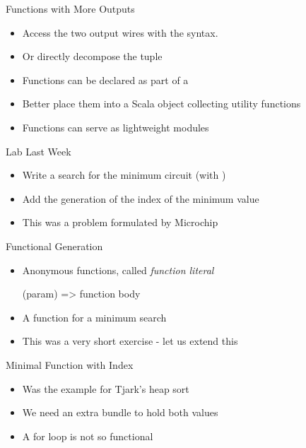 \begin{frame}[fragile]{Functions with More Outputs}
\begin{itemize}
\item Access the two output wires with the  syntax.
\item Or directly decompose the tuple
\item Functions can be declared as part of a 
\item Better place them into a Scala object collecting utility functions
\item Functions can serve as lightweight modules
\end{itemize}
\end{frame}

\begin{frame}[fragile]{Lab Last Week}
\begin{itemize}
\item Write a search for the minimum circuit (with )
\item Add the generation of the index of the minimum value
\item This was a problem formulated by Microchip
\end{itemize}
\end{frame}

\begin{frame}[fragile]{Functional Generation}
\begin{itemize}
\item Anonymous functions, called \emph{function literal}
\begin{chisel}
  (param) => function body
\end{chisel}
\item A function for a minimum search
\item This was a very short exercise - let us extend this
\end{itemize}
\end{frame}


\begin{frame}[fragile]{Minimal Function with Index}
\begin{itemize}
\item Was the example for Tjark's heap sort
\item We need an extra bundle to hold both values
\item A for loop is not so functional
\end{itemize}
\end{frame}

